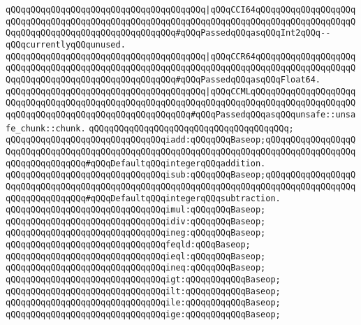 \verb|qQQqqQQqqQQqqQQqqQQqqQQqqQQqqQQqqQQqqQQq|\verb#|qQQqCCI64qQQqqQQqqQQqqQQqqQQqqQQqqQQqqQQqqQQqqQQqqQQqqQQqqQQqqQQqqQQqqQQqqQQqqQQqqQQqqQQqqQQqqQQqqQQqqQQqqQQqqQQqqQQqqQQqqQQqqQQqqQQq#\verb|#qQQqPassedqQQqasqQQqInt2qQQq--qQQqcurrentlyqQQqunused.|\newline
\verb|qQQqqQQqqQQqqQQqqQQqqQQqqQQqqQQqqQQqqQQq|\verb#|qQQqCCR64qQQqqQQqqQQqqQQqqQQqqQQqqQQqqQQqqQQqqQQqqQQqqQQqqQQqqQQqqQQqqQQqqQQqqQQqqQQqqQQqqQQqqQQqqQQqqQQqqQQqqQQqqQQqqQQqqQQqqQQqqQQq#\verb|#qQQqPassedqQQqasqQQqFloat64.|\newline
\verb|qQQqqQQqqQQqqQQqqQQqqQQqqQQqqQQqqQQqqQQq|\verb#|qQQqCCMLqQQqqQQqqQQqqQQqqQQqqQQqqQQqqQQqqQQqqQQqqQQqqQQqqQQqqQQqqQQqqQQqqQQqqQQqqQQqqQQqqQQqqQQqqQQqqQQqqQQqqQQqqQQqqQQqqQQqqQQqqQQqqQQq#\verb|#qQQqPassedqQQqasqQQqunsafe::unsafe_chunk::chunk.|\newline
\verb|qQQqqQQqqQQqqQQqqQQqqQQqqQQqqQQqqQQqqQQq;|\newline
\newline
\verb|qQQqqQQqqQQqqQQqqQQqqQQqqQQqqQQqiadd:qQQqqQQqBaseop;qQQqqQQqqQQqqQQqqQQqqQQqqQQqqQQqqQQqqQQqqQQqqQQqqQQqqQQqqQQqqQQqqQQqqQQqqQQqqQQqqQQqqQQqqQQqqQQqqQQqqQQq#qQQqDefaultqQQqintegerqQQqaddition.|\newline
\verb|qQQqqQQqqQQqqQQqqQQqqQQqqQQqqQQqisub:qQQqqQQqBaseop;qQQqqQQqqQQqqQQqqQQqqQQqqQQqqQQqqQQqqQQqqQQqqQQqqQQqqQQqqQQqqQQqqQQqqQQqqQQqqQQqqQQqqQQqqQQqqQQqqQQqqQQq#qQQqDefaultqQQqintegerqQQqsubtraction.|\newline
\verb|qQQqqQQqqQQqqQQqqQQqqQQqqQQqqQQqimul:qQQqqQQqBaseop;|\newline
\verb|qQQqqQQqqQQqqQQqqQQqqQQqqQQqqQQqidiv:qQQqqQQqBaseop;|\newline
\verb|qQQqqQQqqQQqqQQqqQQqqQQqqQQqqQQqineg:qQQqqQQqBaseop;|\newline
\newline
\verb|qQQqqQQqqQQqqQQqqQQqqQQqqQQqqQQqfeqld:qQQqBaseop;|\newline
\verb|qQQqqQQqqQQqqQQqqQQqqQQqqQQqqQQqieql:qQQqqQQqBaseop;|\newline
\verb|qQQqqQQqqQQqqQQqqQQqqQQqqQQqqQQqineq:qQQqqQQqBaseop;|\newline
\verb|qQQqqQQqqQQqqQQqqQQqqQQqqQQqqQQqigt:qQQqqQQqqQQqBaseop;|\newline
\verb|qQQqqQQqqQQqqQQqqQQqqQQqqQQqqQQqilt:qQQqqQQqqQQqBaseop;|\newline
\verb|qQQqqQQqqQQqqQQqqQQqqQQqqQQqqQQqile:qQQqqQQqqQQqBaseop;|\newline
\verb|qQQqqQQqqQQqqQQqqQQqqQQqqQQqqQQqige:qQQqqQQqqQQqBaseop;|\newline
